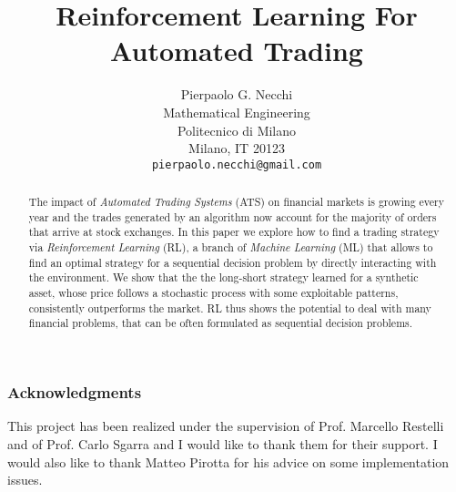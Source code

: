 \documentclass{article} %
\title{Reinforcement Learning For Automated Trading}
\author{%
Pierpaolo G. Necchi\\
Mathematical Engineering\\
Politecnico di Milano\\
Milano, IT 20123 \\
\texttt{pierpaolo.necchi@gmail.com}
}
\begin{document}
\maketitle

\begin{abstract}
	The impact of \emph{Automated Trading Systems} (ATS) on financial markets is growing every year and the trades generated by an algorithm now account for the majority of orders that arrive at stock exchanges. In this paper we explore how to find a trading strategy via \emph{Reinforcement Learning} (RL), a branch of \emph{Machine Learning} (ML) that allows to find an optimal strategy for a sequential decision problem by directly interacting with the environment. We show that the the long-short strategy learned for a synthetic asset, whose price follows a stochastic process with some exploitable patterns, consistently outperforms the market. RL thus shows the potential to deal with many financial problems, that can be often formulated as sequential decision problems. 
\end{abstract}


\clearpage








\subsubsection*{Acknowledgments}
This project has been realized under the supervision of Prof. Marcello Restelli and of Prof. Carlo Sgarra and I would like to thank them for their support. I would also like to thank Matteo Pirotta for his advice on some implementation issues. 

\clearpage


\end{document}
